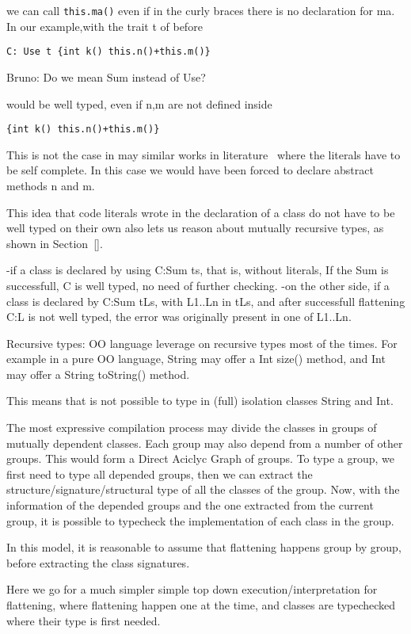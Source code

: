 \documentclass{llncs}
\newcommand{\mynotes}[3]{{\color{#2} {\sc #1}: #3}}
\newcommand\bruno[1]{\mynotes{Bruno}{red}{#1}}
\begin{document}
\noindent we can call \lstinline{this.ma()} even if in the curly braces there is no declaration for ma.
In our example,with the trait t of before

\begin{lstlisting}
C: Use t {int k() this.n()+this.m()}
\end{lstlisting}
\bruno{Do we mean Sum instead of Use?}

\noindent would be well typed, even if n,m are not defined inside
\begin{lstlisting}
{int k() this.n()+this.m()}
\end{lstlisting}
This is not the case in may similar works in literature~\cite{} where the
literals have to be self complete. In this case we would have been forced to
declare abstract methods n and m.

This idea that code literals wrote
in the declaration of a class
do not have to be well typed on their own also lets us
reason about mutually recursive types, as shown in Section~\ref{}. 

-if a class is declared by using C:Sum ts, that is, without literals,
If the Sum is successfull, C is well typed, no need of further checking.
-on the other side, if a class is declared by C:Sum tLs, with
L1..Ln in tLs, and after successfull flattening C:L is not well typed,
the error was originally present in one of L1..Ln.

Recursive types:
OO language leverage on recursive types most of the times.
For example in a pure OO language, String may offer a Int size()
method, and Int may offer a String toString() method.

This means that is not possible to type in (full) isolation classes
String and Int.

The most expressive compilation process may divide the classes in groups of mutually 
dependent classes.
Each group may also depend from a number of other groups.
This would form a Direct Aciclyc Graph of groups.
To type a group, we first need to type all depended groups, then
we can extract the structure/signature/structural type of all
the classes of the group.
Now, with the information of the depended groups and the one extracted
from the current group, it is possible to typecheck the implementation
 of each class in the group.

In this model, it is reasonable to assume that flattening happens group by group, before
extracting the class signatures.

Here we go for a much simpler simple top down execution/interpretation for flattening, where flattening
happen one at the time, and classes are typechecked where their type is first needed.
\end{document}
